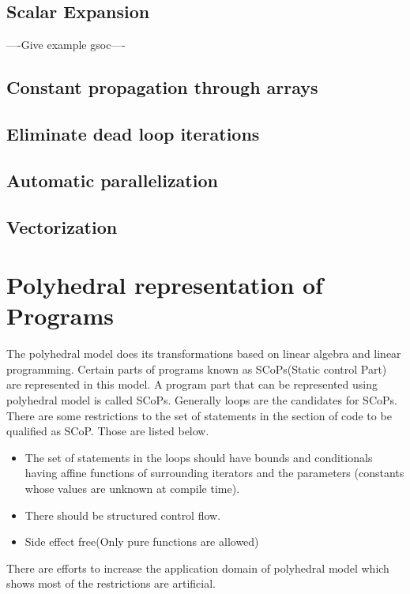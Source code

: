 \subsection{Scalar Expansion}

----Give example gsoc----

\subsection{Constant propagation through arrays}
\subsection{Eliminate dead loop iterations}
\subsection{Automatic parallelization}
\subsection{Vectorization}

\section{Polyhedral representation of Programs}

The polyhedral model does its transformations based on linear algebra and linear programming.
Certain parts of programs known as SCoPs(Static control Part) are represented in this model.
A program part that can be represented using polyhedral model is called SCoPs. Generally
loops are the candidates for SCoPs. There are some restrictions to the set of statements 
in the section of code to be qualified as SCoP. Those are listed below.

\begin{itemize}
\item The set of statements in the loops should have bounds and conditionals having affine functions
of surrounding iterators and the parameters (constants whose values are unknown at compile time).
\item There should be structured control flow.
\item Side effect free(Only pure functions are allowed)
\end{itemize}

There are efforts to increase the application domain of polyhedral model \cite{Benabderrahmane}
which shows most of the restrictions are artificial.

